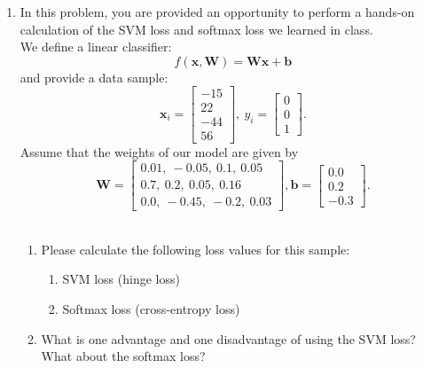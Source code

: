 \documentclass[a4paper]{article}
\begin{document}
\begin{enumerate}
\item In this problem, you are provided an opportunity to perform a hands-on calculation of the SVM loss and softmax loss we learned in class.\\
We define a linear classifier: $$f(\bm{x}, \bm{W}) = \bm{W}\bm{x}+\bm{b}$$ and provide a data sample: $$\bm{x}_i = \begin{bmatrix}-15\\ 22\\ -44\\ 56 \end{bmatrix},\ y_i=\begin{bmatrix}
0 \\ 0 \\ 1
\end{bmatrix}.$$ 
Assume that the weights of our model are given by $$\bm{W}=\begin{bmatrix}0.01,\ -0.05,\ 0.1,\ 0.05\\ 0.7,\ 0.2,\ 0.05,\ 0.16\\0.0,\ -0.45,\ -0.2,\ 0.03\end{bmatrix}, \bm{b}=\begin{bmatrix}0.0\\ 0.2\\ -0.3\end{bmatrix}.$$\\
\begin{enumerate}
	\item Please calculate the following loss values for this sample:
	\begin{enumerate}
		\item SVM loss (hinge loss)
		\item Softmax loss (cross-entropy loss)
	\end{enumerate}
	\item What is one advantage and one disadvantage of using the SVM loss? What about the softmax loss?
\end{enumerate}
\end{enumerate}
\end{document}
